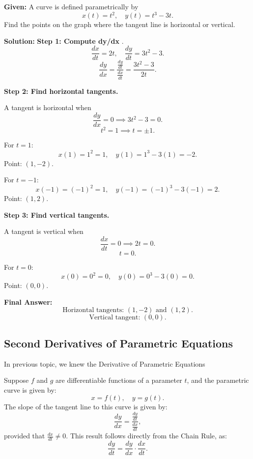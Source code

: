 \documentclass[12pt]{article}
\theoremstyle{beautifulthm}
\begin{document}
\begin{tcolorbox}[colback=examplebg, colframe=red!75!black, title=\textbf{EXAMPLE 3: Determine the Tangent Line is Horizontal or Vertical}, fonttitle=\bfseries, sharp corners]
\textbf{Given:} A curve is defined parametrically by 
\[
x(t) = t^2, \quad y(t) = t^3 - 3t.
\]
Find the points on the graph where the tangent line is horizontal or vertical.


\tcblower
\textbf{Solution:} 
\textbf{Step 1: Compute dy/dx} .
\[
\frac{dx}{dt} = 2t, \quad \frac{dy}{dt} = 3t^2 - 3.
\]
\[
\frac{dy}{dx} = \frac{\frac{dy}{dt}}{\frac{dx}{dt}} = \frac{3t^2 - 3}{2t}.
\]

\textbf{Step 2: Find horizontal tangents.}

A tangent is horizontal when 
\[
\frac{dy}{dx} = 0 \implies 3t^2 - 3 = 0.
\]
\[
t^2 = 1 \implies t = \pm 1.
\]

For \( t = 1 \):
\[
x(1) = 1^2 = 1, \quad y(1) = 1^3 - 3(1) = -2.
\]
Point: \( (1, -2) \).

For \( t = -1 \):
\[
x(-1) = (-1)^2 = 1, \quad y(-1) = (-1)^3 - 3(-1) = 2.
\]
Point: \( (1, 2) \).

\textbf{Step 3: Find vertical tangents.}

A tangent is vertical when 
\[
\frac{dx}{dt} = 0 \implies 2t = 0.
\]
\[
t = 0.
\]

For \( t = 0 \):
\[
x(0) = 0^2 = 0, \quad y(0) = 0^3 - 3(0) = 0.
\]
Point: \( (0, 0) \).

\textbf{Final Answer:}
\[
\text{Horizontal tangents: } (1, -2) \text{ and } (1, 2).
\]
\[
\text{Vertical tangent: } (0, 0).
\]
\end{tcolorbox}




\newpage

\subsection{Second Derivatives of
Parametric Equations}

\noindent In previous topic, we knew the Derivative of Parametric Equations

\noindent Suppose $f$ and $g$ are differentiable functions of a parameter $t$, and the parametric curve is given by:
\[
x = f(t), \quad y = g(t).
\]
The slope of the tangent line to this curve is given by:
\[
\frac{dy}{dx} = \frac{\frac{dy}{dt}}{\frac{dx}{dt}},
\]
provided that $\frac{dx}{dt} \neq 0$. This result follows directly from the Chain Rule, as:
\[
\frac{dy}{dt} = \frac{dy}{dx} \cdot \frac{dx}{dt}.
\]
\end{document}
